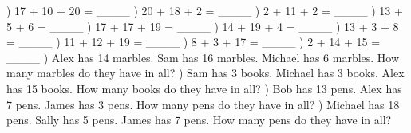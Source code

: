 \documentclass{article}%
\begin{document}
) 17 + 10 + 20 = \_\_\_\_%
\newline%
\newline%
) 20 + 18 + 2 = \_\_\_\_%
\newline%
\newline%
) 2 + 11 + 2 = \_\_\_\_%
\newline%
\newline%
) 13 + 5 + 6 = \_\_\_\_%
\newline%
\newline%
) 17 + 17 + 19 = \_\_\_\_%
\newline%
\newline%
) 14 + 19 + 4 = \_\_\_\_%
\newline%
\newline%
) 13 + 3 + 8 = \_\_\_\_%
\newline%
\newline%
) 11 + 12 + 19 = \_\_\_\_%
\newline%
\newline%
) 8 + 3 + 17 = \_\_\_\_%
\newline%
\newline%
) 2 + 14 + 15 = \_\_\_\_%
\newline%
\newline%
) Alex has 14 marbles. Sam has 16 marbles. Michael has 6 marbles. How many marbles do they have in all?%
\newline%
\newline%
) Sam has 3 books. Michael has 3 books. Alex has 15 books. How many books do they have in all?%
\newline%
\newline%
) Bob has 13 pens. Alex has 7 pens. James has 3 pens. How many pens do they have in all?%
\newline%
\newline%
) Michael has 18 pens. Sally has 5 pens. James has 7 pens. How many pens do they have in all?%
\end{document}
